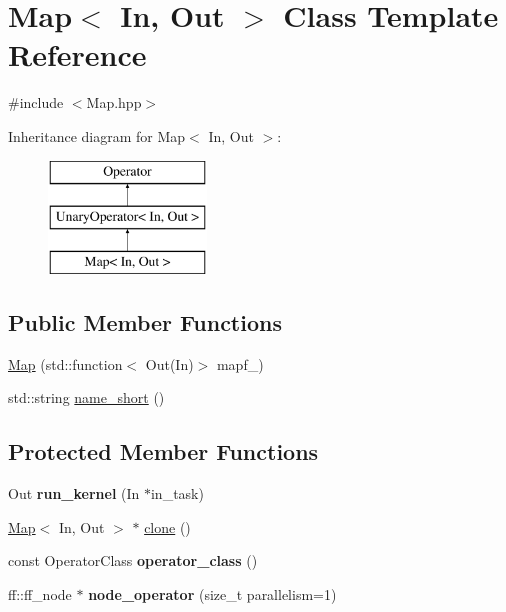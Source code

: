 \hypertarget{class_map}{\section{\-Map$<$ \-In, \-Out $>$ \-Class \-Template \-Reference}
\label{class_map}
}


{\ttfamily \#include $<$\-Map.\-hpp$>$}

\-Inheritance diagram for \-Map$<$ \-In, \-Out $>$\-:\begin{figure}[H]
\begin{center}
\leavevmode
\includegraphics[height=3.000000cm]{class_map}
\end{center}
\end{figure}
\subsection*{\-Public \-Member \-Functions}
\begin{DoxyCompactItemize}
\item 
\hyperlink{class_map_a592d69e973dc2596ab688914fb7f5f65}{\-Map} (std\-::function$<$ \-Out(\-In)$>$ mapf\-\_\-)
\item 
std\-::string \hyperlink{class_map_a0ac45a1807983af02472c0a01994bf61}{name\-\_\-short} ()
\end{DoxyCompactItemize}
\subsection*{\-Protected \-Member \-Functions}
\begin{DoxyCompactItemize}
\item 
\hypertarget{class_map_ae61a30423820caac53954f22c5935580}{\-Out {\bfseries run\-\_\-kernel} (\-In $\ast$in\-\_\-task)}\label{class_map_ae61a30423820caac53954f22c5935580}

\item 
\hyperlink{class_map}{\-Map}$<$ \-In, \-Out $>$ $\ast$ \hyperlink{class_map_a0524200b07c1713bc9f3dd60b372b30c}{clone} ()
\item 
\hypertarget{class_map_a5c9fcf56ffe1fd40d3642bcfc561844a}{const \-Operator\-Class {\bfseries operator\-\_\-class} ()}\label{class_map_a5c9fcf56ffe1fd40d3642bcfc561844a}

\item 
\hypertarget{class_map_ae0cc5feac0abb9c2a7cad61dbf50157e}{ff\-::ff\-\_\-node $\ast$ {\bfseries node\-\_\-operator} (size\-\_\-t parallelism=1)}\label{class_map_ae0cc5feac0abb9c2a7cad61dbf50157e}

\end{DoxyCompactItemize}
